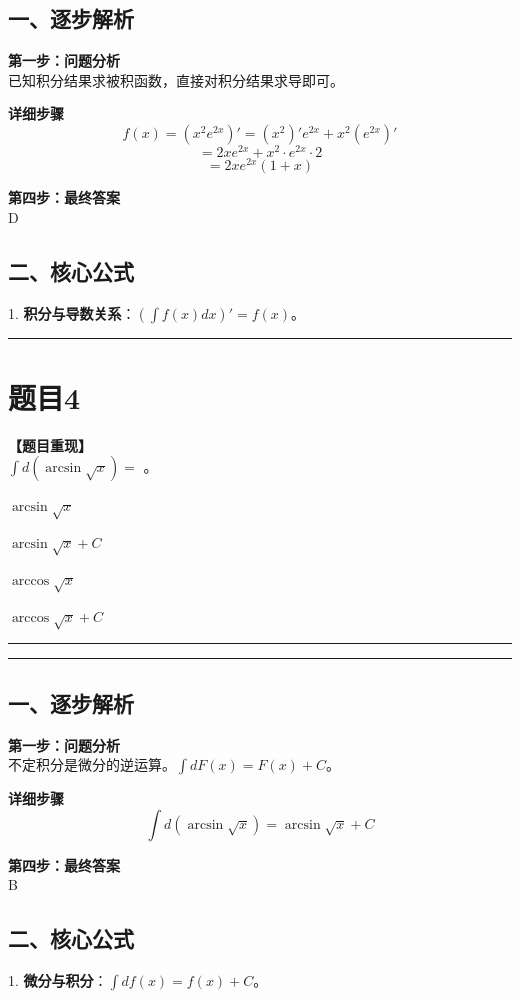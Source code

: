 \documentclass[12pt, a4paper]{ctexart}
\newcommand{\TopSeparator}{
    \par\noindent\rule{\textwidth}{1.5pt}\vspace{0.5em} %
}
\newcommand{\AnalysisSeparator}{
    \par\noindent\rule{\textwidth}{0.5pt}\vspace{0.2em}\hrule\vspace{0.5em} %
}
\newenvironment{RedAnalysis}{
    \par
    \color{red} %
}{
    \par
    \color{black} %
}
\newcommand{\choicesFour}[4]{
    \begin{enumerate}[label=\Alph*., itemsep=0pt, parsep=0pt, topsep=5pt, labelsep=0.5em]
        \begin{minipage}{0.22\linewidth} \item #1 \end{minipage}
        \begin{minipage}{0.22\linewidth} \item #2 \end{minipage}
        \begin{minipage}{0.22\linewidth} \item #3 \end{minipage}
        \begin{minipage}{0.22\linewidth} \item #4 \end{minipage}
    \end{enumerate}
}
\begin{document}
\begin{RedAnalysis}

\subsection*{一、逐步解析}

\textbf{第一步：问题分析} \\
已知积分结果求被积函数，直接对积分结果求导即可。

\textbf{详细步骤} \\
\[ f(x) = (x^2 e^{2x})' = (x^2)'e^{2x} + x^2(e^{2x})' \]
\[ = 2x e^{2x} + x^2 \cdot e^{2x} \cdot 2 \]
\[ = 2xe^{2x}(1 + x) \]

\textbf{第四步：最终答案} \\
D

\subsection*{二、核心公式}
1. \textbf{积分与导数关系}：$(\int f(x) dx)' = f(x)$。

\end{RedAnalysis}

\vspace{2em}

\TopSeparator
\section*{题目4}

\textbf{【题目重现】} \\
$ \int d(\arcsin\sqrt{x}) = $ \underline{\hspace{1cm}}。
\choicesFour{$ \arcsin\sqrt{x} $}{$ \arcsin\sqrt{x}+C $}{$ \arccos\sqrt{x} $}{$ \arccos\sqrt{x}+C $}

\AnalysisSeparator

\begin{RedAnalysis}

\subsection*{一、逐步解析}

\textbf{第一步：问题分析} \\
不定积分是微分的逆运算。$\int dF(x) = F(x) + C$。

\textbf{详细步骤} \\
\[ \int d(\arcsin\sqrt{x}) = \arcsin\sqrt{x} + C \]

\textbf{第四步：最终答案} \\
B

\subsection*{二、核心公式}
1. \textbf{微分与积分}：$\int df(x) = f(x) + C$。

\end{RedAnalysis}
\end{document}
